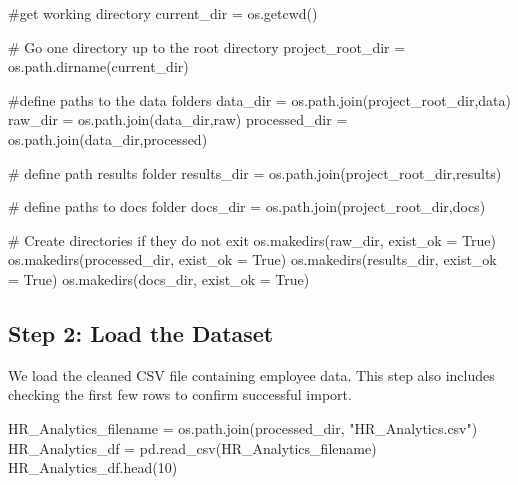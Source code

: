 \documentclass[
  letterpaper,
  DIV=11,
  numbers=noendperiod]{scrartcl}
\newenvironment{Shaded}{\begin{snugshade}}{\end{snugshade}}
\newcommand{\CommentTok}[1]{\textcolor[rgb]{0.37,0.37,0.37}{#1}}
\newcommand{\DecValTok}[1]{\textcolor[rgb]{0.68,0.00,0.00}{#1}}
\newcommand{\NormalTok}[1]{\textcolor[rgb]{0.00,0.23,0.31}{#1}}
\newcommand{\OperatorTok}[1]{\textcolor[rgb]{0.37,0.37,0.37}{#1}}
\newcommand{\StringTok}[1]{\textcolor[rgb]{0.13,0.47,0.30}{#1}}
\newcommand{\VariableTok}[1]{\textcolor[rgb]{0.07,0.07,0.07}{#1}}
\begin{document}
\begin{Shaded}
\begin{Highlighting}[]
\CommentTok{\#get working directory}
\NormalTok{current\_dir }\OperatorTok{=}\NormalTok{ os.getcwd()}

\CommentTok{\# Go one directory up to the root directory}
\NormalTok{project\_root\_dir }\OperatorTok{=}\NormalTok{ os.path.dirname(current\_dir)}

\CommentTok{\#define paths to the data folders}
\NormalTok{data\_dir }\OperatorTok{=}\NormalTok{ os.path.join(project\_root\_dir,}\StringTok{\textquotesingle{}data\textquotesingle{}}\NormalTok{)}
\NormalTok{raw\_dir }\OperatorTok{=}\NormalTok{ os.path.join(data\_dir,}\StringTok{\textquotesingle{}raw\textquotesingle{}}\NormalTok{)}
\NormalTok{processed\_dir }\OperatorTok{=}\NormalTok{ os.path.join(data\_dir,}\StringTok{\textquotesingle{}processed\textquotesingle{}}\NormalTok{) }

\CommentTok{\# define path results folder }
\NormalTok{results\_dir }\OperatorTok{=}\NormalTok{ os.path.join(project\_root\_dir,}\StringTok{\textquotesingle{}results\textquotesingle{}}\NormalTok{)}

\CommentTok{\# define paths to docs folder}
\NormalTok{docs\_dir }\OperatorTok{=}\NormalTok{ os.path.join(project\_root\_dir,}\StringTok{\textquotesingle{}docs\textquotesingle{}}\NormalTok{)}

\CommentTok{\# Create directories if they do not exit}
\NormalTok{os.makedirs(raw\_dir, exist\_ok }\OperatorTok{=} \VariableTok{True}\NormalTok{) }
\NormalTok{os.makedirs(processed\_dir, exist\_ok }\OperatorTok{=} \VariableTok{True}\NormalTok{) }
\NormalTok{os.makedirs(results\_dir, exist\_ok }\OperatorTok{=} \VariableTok{True}\NormalTok{)}
\NormalTok{os.makedirs(docs\_dir, exist\_ok }\OperatorTok{=} \VariableTok{True}\NormalTok{)}
\end{Highlighting}
\end{Shaded}

\subsection{Step 2: Load the Dataset}\label{step-2-load-the-dataset}

We load the cleaned CSV file containing employee data. This step also
includes checking the first few rows to confirm successful import.

\begin{Shaded}
\begin{Highlighting}[]
\NormalTok{HR\_Analytics\_filename }\OperatorTok{=}\NormalTok{ os.path.join(processed\_dir, }\StringTok{"HR\_Analytics.csv"}\NormalTok{)}
\NormalTok{HR\_Analytics\_df }\OperatorTok{=}\NormalTok{ pd.read\_csv(HR\_Analytics\_filename)}
\NormalTok{HR\_Analytics\_df.head(}\DecValTok{10}\NormalTok{)}
\end{Highlighting}
\end{Shaded}
\end{document}
